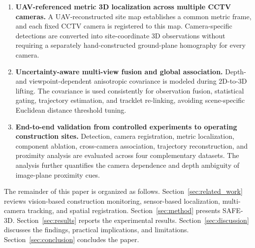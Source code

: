 \begin{enumerate}[leftmargin=*]
    \item \textbf{UAV-referenced metric 3D localization across multiple CCTV cameras.} A UAV-reconstructed site map establishes a common metric frame, and each fixed CCTV camera is registered to this map. Camera-specific detections are converted into site-coordinate 3D observations without requiring a separately hand-constructed ground-plane homography for every camera.

    \item \textbf{Uncertainty-aware multi-view fusion and global association.} Depth- and viewpoint-dependent anisotropic covariance is modeled during 2D-to-3D lifting. The covariance is used consistently for observation fusion, statistical gating, trajectory estimation, and tracklet re-linking, avoiding scene-specific Euclidean distance threshold tuning.

    \item \textbf{End-to-end validation from controlled experiments to operating construction sites.} Detection, camera registration, metric localization, component ablation, cross-camera association, trajectory reconstruction, and proximity analysis are evaluated across four complementary datasets. The analysis further quantifies the camera dependence and depth ambiguity of image-plane proximity cues.
\end{enumerate}

The remainder of this paper is organized as follows. Section~\ref{sec:related_work} reviews vision-based construction monitoring, sensor-based localization, multi-camera tracking, and spatial registration. Section~\ref{sec:method} presents SAFE-3D. Section~\ref{sec:results} reports the experimental results. Section~\ref{sec:discussion} discusses the findings, practical implications, and limitations. Section~\ref{sec:conclusion} concludes the paper.
